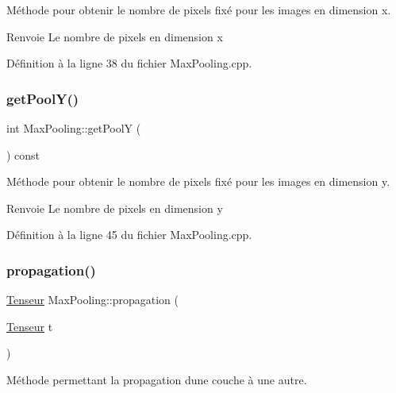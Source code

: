 Méthode pour obtenir le nombre de pixels fixé pour les images en dimension x. 

\begin{DoxyReturn}{Renvoie}
Le nombre de pixels en dimension x 
\end{DoxyReturn}


Définition à la ligne 38 du fichier Max\+Pooling.\+cpp.

\mbox{\label{class_max_pooling_a7c72e57c8a90e18804b288f28fde7af0}} 
\subsubsection{\texorpdfstring{get\+Pool\+Y()}{getPoolY()}}
{\footnotesize\ttfamily int Max\+Pooling\+::get\+PoolY (\begin{DoxyParamCaption}{ }\end{DoxyParamCaption}) const}



Méthode pour obtenir le nombre de pixels fixé pour les images en dimension y. 

\begin{DoxyReturn}{Renvoie}
Le nombre de pixels en dimension y 
\end{DoxyReturn}


Définition à la ligne 45 du fichier Max\+Pooling.\+cpp.

\mbox{\label{class_max_pooling_a48e0258bf1f949853cfceb2726035fb8}} 
\subsubsection{\texorpdfstring{propagation()}{propagation()}}
{\footnotesize\ttfamily \hyperlink{class_tenseur}{Tenseur} Max\+Pooling\+::propagation (\begin{DoxyParamCaption}\item[{\hyperlink{class_tenseur}{Tenseur}}]{t }\end{DoxyParamCaption})\hspace{0.3cm}{\ttfamily [virtual]}}



Méthode permettant la propagation d\textquotesingle{}une couche à une autre. 



